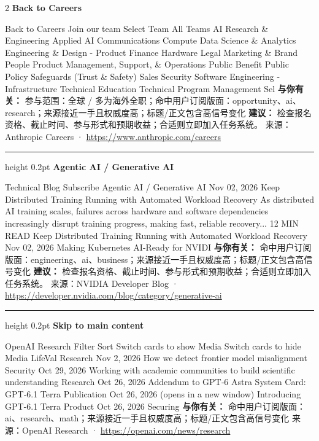 \documentclass[10.5pt]{ctexart}
\begin{document}
\begin{multicols}{2}
{\large\bfseries Back to Careers}\par
Back to Careers Join our team Select Team All Teams AI Research \& Engineering Applied AI Communications Compute Data Science \& Analytics Engineering \& Design - Product Finance Hardware Legal Marketing \& Brand People Product Management, Support, \& Operations Public Benefit Public Policy Safeguards (Trust \& Safety) Sales Security Software Engineering - Infrastructure Technical Education Technical Program Management Sel
\textbf{与你有关：} 参与范围：全球 / 多为海外全职；命中用户订阅版面：opportunity、ai、research；来源接近一手且权威度高；标题/正文包含高信号变化
\textbf{建议：} 检查报名资格、截止时间、参与形式和预期收益；合适则立即加入任务系统。
{\footnotesize\color{ormuted} 来源：Anthropic Careers · \url{https://www.anthropic.com/careers}}
\vspace{2mm}
\hrule height 0.2pt
\vspace{2mm}
{\large\bfseries Agentic AI / Generative AI}\par
Technical Blog Subscribe Agentic AI / Generative AI Nov 02, 2026 Keep Distributed Training Running with Automated Workload Recovery As distributed AI training scales, failures across hardware and software dependencies increasingly disrupt training progress, making fast, reliable recovery... 12 MIN READ Keep Distributed Training Running with Automated Workload Recovery Nov 02, 2026 Making Kubernetes AI-Ready for NVIDI
\textbf{与你有关：} 命中用户订阅版面：engineering、ai、business；来源接近一手且权威度高；标题/正文包含高信号变化
\textbf{建议：} 检查报名资格、截止时间、参与形式和预期收益；合适则立即加入任务系统。
{\footnotesize\color{ormuted} 来源：NVIDIA Developer Blog · \url{https://developer.nvidia.com/blog/category/generative-ai}}
\vspace{2mm}
\hrule height 0.2pt
\vspace{2mm}
{\large\bfseries Skip to main content}\par
OpenAI Research Filter Sort Switch cards to show Media Switch cards to hide Media LifeVal Research Nov 2, 2026 How we detect frontier model misalignment Security Oct 29, 2026 Working with academic communities to build scientific understanding Research Oct 26, 2026 Addendum to GPT‑6 Astra System Card: GPT‑6.1 Terra Publication Oct 26, 2026 (opens in a new window) Introducing GPT-6.1 Terra Product Oct 26, 2026 Securing
\textbf{与你有关：} 命中用户订阅版面：ai、research、math；来源接近一手且权威度高；标题/正文包含高信号变化
{\footnotesize\color{ormuted} 来源：OpenAI Research · \url{https://openai.com/news/research}}

\end{multicols}
\end{document}
